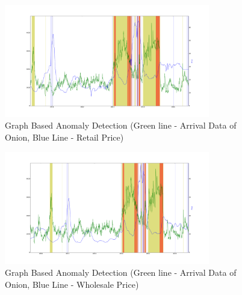 \documentclass[a4paper,10pt]{report}
\begin{document}
			
			\begin{figure}[H]
		    	\centering
  		    	\includegraphics[width=0.8\textwidth]{graphs/12322_delhi.png}
		    	\caption{Graph Based Anomaly Detection (Green line - Arrival Data of Onion, Blue Line - Retail Price)}
		    	\label{fig:12322_delhi}
			\end{figure}
			
			\begin{figure}[H]
		    	\centering
  		    	\includegraphics[width=0.8\textwidth]{graphs/12442_delhi.png}
		    	\caption{Graph Based Anomaly Detection (Green line - Arrival Data of Onion, Blue Line - Wholesale Price)}
		    	\label{fig:12442_delhi}
			\end{figure}	
\end{document}
